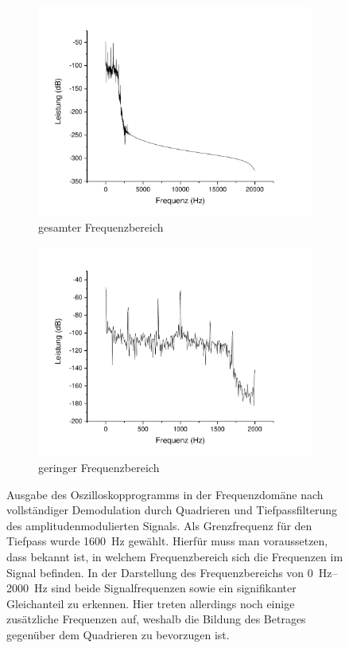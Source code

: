\documentclass[
a4paper,
12pt,
pagesize,
ngerman
]{scrartcl}
\begin{document}
	\begin{figure}[H]
		\centering
		\begin{subfigure}[t]{0.5\textwidth}
			\centering
			\includegraphics[width=1\textwidth]{Origin-Files/AM-Demod-Quadrat-demod}
			\caption{gesamter Frequenzbereich}
		\end{subfigure}%
		\begin{subfigure}[t]{0.5\textwidth}
			\centering
			\includegraphics[width=1\textwidth]{Origin-Files/AM-Demod-Quadrat-demod-Bereich}
			\caption{geringer Frequenzbereich}
			\label{fig_tag3_am_demod_quadrat_vollst}
		\end{subfigure}
	
		\caption{Ausgabe des Oszilloskopprogramms in der Frequenzdomäne nach vollständiger Demodulation durch Quadrieren und Tiefpassfilterung des amplitudenmodulierten Signals.
		Als Grenzfrequenz für den Tiefpass wurde \SI{1600}{\hertz} gewählt.
		Hierfür muss man voraussetzen, dass bekannt ist, in welchem Frequenzbereich sich die Frequenzen im Signal befinden.
		In der Darstellung des Frequenzbereichs von \SIrange{0}{2000}{\hertz} sind beide Signalfrequenzen sowie ein signifikanter Gleichanteil zu erkennen.
		Hier treten allerdings noch einige zusätzliche Frequenzen auf, weshalb die Bildung des Betrages gegenüber dem Quadrieren zu bevorzugen ist.
		}
		\centering
	\end{figure}
\end{document}
